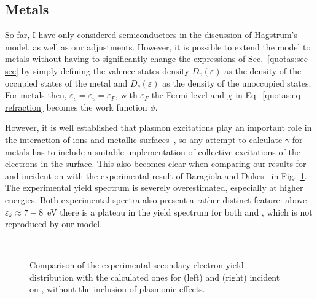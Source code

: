 \begin{refsection}
\section{Metals} \label{quotas:sec-metals}

So far, I have only considered semiconductors in the discussion of Hagstrum's model, as well as our adjustments. However, it is possible to extend the model to metals without having to significantly change the expressions of Sec.~\ref{quotas:sec-see} by simply defining the valence states density $D_v(\varepsilon)$ as the density of the occupied states of the metal and $D_c(\varepsilon)$ as the density of the unoccupied states. For metals then, $\varepsilon_c = \varepsilon_v = \varepsilon_F$, with $\varepsilon_F$ the Fermi level and $\chi$ in Eq.~\ref{quotas:eq-refraction} becomes the work function $\phi$.

However, it is well established that plasmon excitations play an important role in the interaction of ions and metallic surfaces~\cite{Baragiola1996, Baragiola2001, Baragiola2007}, so any attempt to calculate $\gamma$ for metals has to include a suitable implementation of collective excitations of the electrons in the surface. This also becomes clear when comparing our results for  and  incident on  with the experimental result of Baragiola and Dukes~\cite{Baragiola1996} in Fig.~\ref{quotas:fig-he_mg_noplasmon}. The experimental yield spectrum is severely overestimated, especially at higher energies. Both experimental spectra also present a rather distinct feature: above $\varepsilon_k \approx 7-8$~\si{\electronvolt} there is a plateau in the yield spectrum for both  and , which is not reproduced by our model.

\begin{figure}[h]
    \centering
    \begin{subfigure}[t]{0.49\textwidth}
        \centering
        
        \vspace{-1em}
        \caption{}
    \end{subfigure}%
    ~ 
    \begin{subfigure}[t]{0.49\textwidth}
        \centering
        
        \vspace{-1em}
        \caption{}
    \end{subfigure}
\caption{Comparison of the experimental secondary electron yield distribution with the calculated ones for  (left) and  (right) incident on , without the inclusion of plasmonic effects.}
\label{quotas:fig-he_mg_noplasmon}
\end{figure}


\end{refsection}
